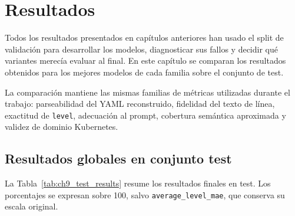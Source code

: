 %
\chapter{Resultados}
\label{ch::chapter8}

Todos los resultados presentados en capítulos anteriores han usado el split de validación para desarrollar los modelos, diagnosticar sus fallos y decidir qué variantes
merecía evaluar al final.
En este capítulo se comparan los resultados obtenidos para los mejores modelos de cada familia sobre el conjunto de test.

La comparación mantiene las mismas familias de métricas utilizadas durante el trabajo: parseabilidad del YAML reconstruido, fidelidad del texto de línea, exactitud de
\texttt{level}, adecuación al prompt, cobertura semántica aproximada y validez de dominio Kubernetes.

\section{Resultados globales en conjunto test}
\label{sec:ch9_test_results}

La Tabla~\ref{tab:ch9_test_results} resume los resultados finales en test. Los porcentajes se expresan sobre 100, salvo \texttt{average\_level\_mae}, que conserva su
escala original.

